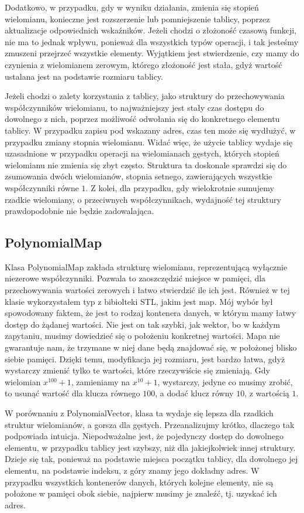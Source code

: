 \documentclass[oneside,a4paper]{book}
\begin{document}
	Dodatkowo, w przypadku, gdy w wyniku działania, zmienia się stopień wielomianu, konieczne jest rozszerzenie lub pomniejszenie tablicy, poprzez aktualizacje odpowiednich wskaźników. Jeżeli chodzi o złożoność czasową funkcji, nie ma to jednak wpływu, ponieważ dla wszystkich typów operacji, i tak jesteśmy zmuszeni przejrzeć wszystkie elementy. Wyjątkiem jest stwierdzenie, czy mamy do czynienia z wielomianem zerowym, którego złożoność jest stała, gdyż wartość ustalana jest na podstawie rozmiaru tablicy.
	
	Jeżeli chodzi o zalety korzystania z tablicy, jako struktury do przechowywania współczynników wielomianu, to najważniejszy jest stały czas dostępu do dowolnego z nich, poprzez możliwość odwołania się do konkretnego elementu tablicy. W przypadku zapisu pod wskazany adres, czas ten może się wydłużyć, w przypadku zmiany stopnia wielomianu. Widać więc, że użycie tablicy wydaje się uzasadnione w przypadku operacji na wielomianach gęstych, których stopień wielomianu nie zmienia się zbyt często. Struktura ta doskonale sprawdzi się do zsumowania dwóch wielomianów, stopnia setnego, zawierających wszystkie współczynniki równe $1$. Z kolei, dla przypadku, gdy wielokrotnie sumujemy rzadkie wielomiany, o przeciwnych współczynnikach, wydajność tej struktury prawdopodobnie nie będzie zadowalająca.
	
	\subsection{PolynomialMap}
	
	Klasa PolynomialMap zakłada strukturę wielomianu, reprezentującą wyłącznie niezerowe współczynniki.
	Pozwala to zaoszczędzić miejsce w pamięci, dla przechowywania wartości zerowych i łatwo stwierdzić ile ich jest. Również w tej klasie wykorzystałem typ z bibiolteki STL, jakim jest map. Mój wybór był spowodowany faktem, że jest to rodzaj kontenera danych, w którym mamy łatwy dostęp do żądanej wartości. Nie jest on tak szybki, jak wektor, bo w każdym zapytaniu, musimy dowiedzieć się o położeniu konkretnej wartości. Mapa nie gwarantuje nam, że trzymane w niej dane będą znajdować się, w położonej blisko siebie pamięci. Dzięki temu, modyfikacja jej rozmiaru, jest bardzo łatwa, gdyż wystarczy zmienić tylko te wartości, które rzeczywiście się zmieniają. Gdy wielomian $x^{100} + 1$, zamieniamy na $x^{10} + 1$, wystarczy, jedyne co musimy zrobić, to usunąć wartość dla klucza równego $100$, a dodać klucz równy $10$, z wartością $1$.
	
	W porównaniu z PolynomialVector, klasa ta wydaje się lepsza dla rzadkich struktur wielomianów, a gorsza dla gęstych. Przeanalizujmy krótko, dlaczego tak podpowiada intuicja. Niepodważalne jest, że pojedynczy dostęp do dowolnego elementu, w przypadku tablicy jest szybszy, niż dla jakiejkolwiek innej struktury. Dzieje się tak, ponieważ na podstawie miejsca początku tablicy, dla dowolnego jej elementu, na podstawie indeksu, z góry znamy jego dokładny adres. W przypadku wszystkich kontenerów danych, których kolejne elementy, nie są położone w pamięci obok siebie, najpierw musimy je znaleźć, tj. uzyskać ich adres.
	
\end{document}
